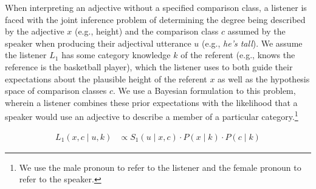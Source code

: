 \documentclass[doc]{apa6}
\begin{document}


%


When interpreting an adjective without a specified comparison class, a listener is faced with the joint inference problem of determining the degree being described by the adjective $x$ (e.g., height) and the comparison class $c$ assumed by the speaker when producing their adjectival utterance $u$ (e.g., \emph{he's tall}).
We assume the listener $L_1$ has some category knowledge $k$ of the referent (e.g., knows the reference is the basketball player), which the listener uses to both guide their expectations about the plausible height of the referent $x$ as well as the hypothesis space of comparison classes $c$. 
We use a Bayesian formulation to this problem, wherein a listener combines these prior expectations with the likelihood that a speaker would use an adjective to describe a member of a particular category.\footnote{We use the male pronoun to refer to the listener and the female pronoun to refer to the speaker.}

\begin{align}
L_1(x, c \mid u, k) &\propto S_1(u \mid x, c) \cdot P(x \mid k) \cdot P(c \mid k) \label{eq:L1a} 
\end{align}
%
\end{document}
